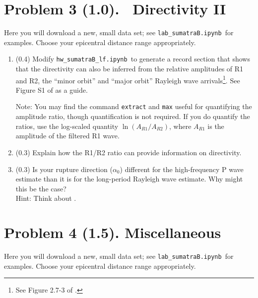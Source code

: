 \documentclass[11pt,titlepage,fleqn]{article}
\newcommand{\tfilelf}{{\tt hw\_sumatraB\_lf.ipynb}}
\newcommand{\tfilelab}{{\tt lab\_sumatraB.ipynb}}
\begin{document}
\section*{Problem 3 (1.0). \ptag\ Directivity II}

Here you will download a new, small data set; see \tfilelab\ for examples. Choose your epicentral distance range appropriately.

\begin{enumerate}
\item (0.4) Modify \tfilelf\ to generate a record section that shows that the directivity can also be inferred from the relative amplitudes of R1 and R2, the ``minor orbit'' and ``major orbit'' Rayleigh wave arrivals\footnote{See Figure 2.7-3 of \citet{SteinWysession}.}. See Figure S1 of \citet{Ammon2005} as a guide.

Note: You may find the command \verb+extract+ and \verb+max+ useful for quantifying the amplitude ratio, though quantification is not required. If you do quantify the ratios, use the log-scaled quantity $\ln(A_{R1}/A_{R2})$, where $A_{R1}$ is the amplitude of the filtered R1 wave.

\item (0.3) Explain how the R1/R2 ratio can provide information on directivity.

\item (0.3) Is your rupture direction ($\alpha_0$) different for the high-frequency P wave estimate than it is for the long-period Rayleigh wave estimate. Why might this be the case? \\
Hint: Think about .
\end{enumerate}


\section*{Problem 4 (1.5). Miscellaneous}

Here you will download a new, small data set; see \tfilelab\ for examples. Choose your epicentral distance range appropriately.
\end{document}
